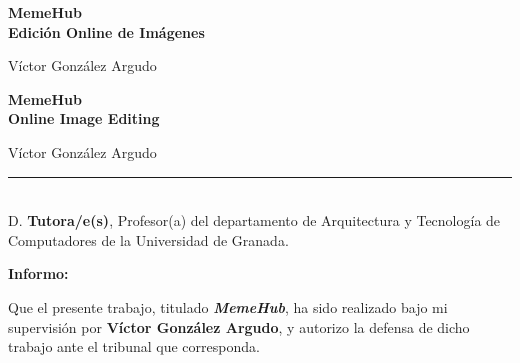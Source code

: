 \thispagestyle{empty}

\begin{center}
{\large\bfseries MemeHub \\ Edición Online de Imágenes }\\
\end{center}
\begin{center}
Víctor González Argudo\\
\end{center}


\vspace{0.5cm}
\vspace{0.7cm}

	

\cleardoublepage

\begin{center}
	{\large\bfseries MemeHub \\ Online Image Editing}\\
\end{center}
\begin{center}
	Víctor González Argudo\\
\end{center}
\vspace{0.5cm}
\vspace{0.7cm}



\cleardoublepage

\thispagestyle{empty}

\noindent\rule[-1ex]{\textwidth}{2pt}\\[4.5ex]

D. \textbf{Tutora/e(s)}, Profesor(a) del departamento de Arquitectura y Tecnología de 
Computadores de la Universidad de Granada.

\vspace{0.5cm}

\textbf{Informo:}

\vspace{0.5cm}

Que el presente trabajo, titulado \textit{\textbf{MemeHub}},
ha sido realizado bajo mi supervisión por \textbf{Víctor González Argudo}, y autorizo la defensa de dicho trabajo ante el tribunal
que corresponda.


